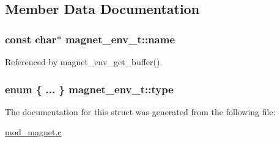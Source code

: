 \subsection{Member Data Documentation}
\hypertarget{structmagnet__env__t_ae7d59ff3aa3b40bcf17d17ce19f85eb9}{
\subsubsection[{name}]{\setlength{\rightskip}{0pt plus 5cm}const char$\ast$ magnet\-\_\-env\-\_\-t\-::name}}\label{structmagnet__env__t_ae7d59ff3aa3b40bcf17d17ce19f85eb9}


Referenced by magnet\-\_\-env\-\_\-get\-\_\-buffer().

\hypertarget{structmagnet__env__t_a297ca9f969a66e5ca6a179ccf3ebb5f1}{
\subsubsection[{type}]{\setlength{\rightskip}{0pt plus 5cm}enum \{ ... \}   magnet\-\_\-env\-\_\-t\-::type}}\label{structmagnet__env__t_a297ca9f969a66e5ca6a179ccf3ebb5f1}


The documentation for this struct was generated from the following file\-:\begin{DoxyCompactItemize}
\item 
\hyperlink{mod__magnet_8c}{mod\-\_\-magnet.\-c}\end{DoxyCompactItemize}
